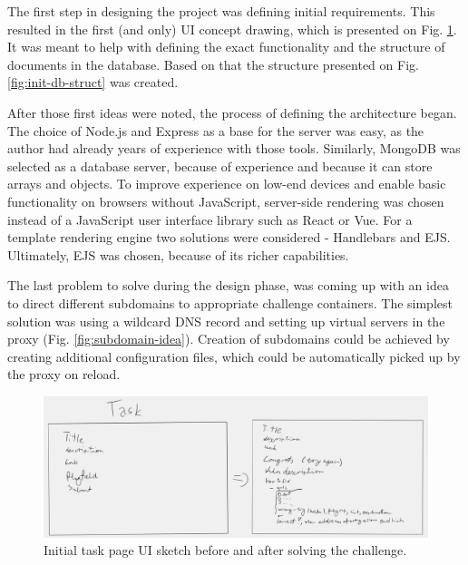 The first step in designing the project was defining initial requirements.
This resulted in the first (and only) UI concept drawing, which is presented on Fig. \ref{fig:init-ui-sketch}. It was meant to help with defining the exact functionality and the structure of documents in the database. Based on that the structure presented on Fig. \ref{fig:init-db-struct} was created.

After those first ideas were noted, the process of defining the architecture began. The choice of Node.js and Express as a base for the server was easy, as the author had already years of experience with those tools. Similarly, MongoDB was selected as a database server, because of experience and because it can store arrays and objects. To improve experience on low-end devices and enable basic functionality on browsers without JavaScript, server-side rendering was chosen instead of a JavaScript user interface library such as React or Vue. For a template rendering engine two solutions were considered - Handlebars and EJS. Ultimately, EJS was chosen, because of its richer capabilities.

The last problem to solve during the design phase, was coming up with an idea to direct different subdomains to appropriate challenge containers. The simplest solution was using a wildcard DNS record and setting up virtual servers in the proxy (Fig. \ref{fig:subdomain-idea}). Creation of subdomains could be achieved by creating additional configuration files, which could be automatically picked up by the proxy on reload.

\begin{figure}
	\centering
	\includegraphics[width=\textwidth]{img/init-ui-sketch.png}
	\caption{Initial task page UI sketch before and after solving the challenge.}
	\label{fig:init-ui-sketch}
\end{figure}

